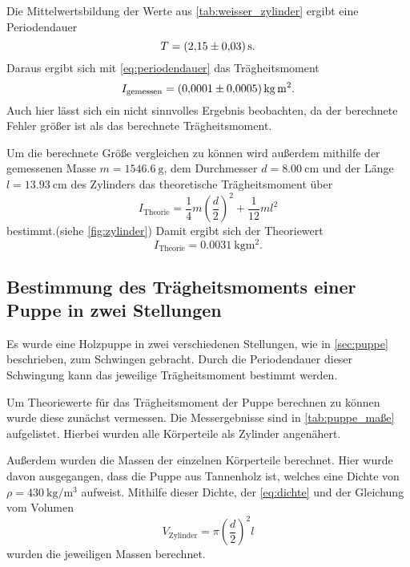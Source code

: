 Die Mittelwertsbildung der Werte aus \autoref{tab:weisser_zylinder} ergibt eine Periodendauer 
\begin{equation}
    T = \SI{2.15+-0.03}{\second}.
\end{equation}
Daraus ergibt sich mit \autoref{eq:periodendauer} das Trägheitsmoment
\begin{equation}
    I_\text{gemessen} = \SI{0.0001+-0.0005}{\kilo\gram\meter\squared}.
\end{equation}
Auch hier lässt sich ein nicht sinnvolles Ergebnis beobachten, da der berechnete Fehler größer ist als das berechnete Trägheitsmoment.

Um die berechnete Größe vergleichen zu können wird außerdem mithilfe der gemessenen Masse $m=\SI{1546.6}{\gram}$, dem Durchmesser $d=\SI{8.00}{\centi\meter}$ und der Länge $l=\SI{13.93}{\centi\meter}$ des Zylinders das theoretische Trägheitsmoment über
\begin{equation}
    I_\text{Theorie} = \frac{1}{4}m\left(\frac{d}{2}\right)^2 + \frac{1}{12}ml^2
\end{equation}
bestimmt.(siehe \autoref{fig:zylinder}) Damit ergibt sich der Theoriewert
\begin{equation}
    I_\text{Theorie} = \SI{0.0031}{\kilo\gram\meter\squared}.
\end{equation}

\subsection{Bestimmung des Trägheitsmoments einer Puppe in zwei Stellungen}
\label{sec:puppe}

Es wurde eine Holzpuppe in zwei verschiedenen Stellungen, wie in \autoref{sec:puppe} beschrieben, zum Schwingen gebracht. 
Durch die Periodendauer dieser Schwingung kann das jeweilige Trägheitsmoment bestimmt werden.

Um Theoriewerte für das Trägheitsmoment der Puppe berechnen zu können wurde diese zunächst vermessen. 
Die Messergebnisse sind in \autoref{tab:puppe_maße} aufgelistet. 
Hierbei wurden alle Körperteile als Zylinder angenähert.

Außerdem wurden die Massen der einzelnen Körperteile berechnet. Hier wurde davon ausgegangen, dass die Puppe aus Tannenholz ist, welches eine Dichte von $\rho = \SI{430}{\kilo\gram\per\meter\cubed}$ aufweist.\cite{holzarten}
Mithilfe dieser Dichte, der \autoref{eq:dichte} und der Gleichung vom Volumen
\begin{equation}
    V_\text{Zylinder} = \pi \left(\frac{d}{2}\right)^2 l 
\end{equation}
wurden die jeweiligen Massen berechnet.

